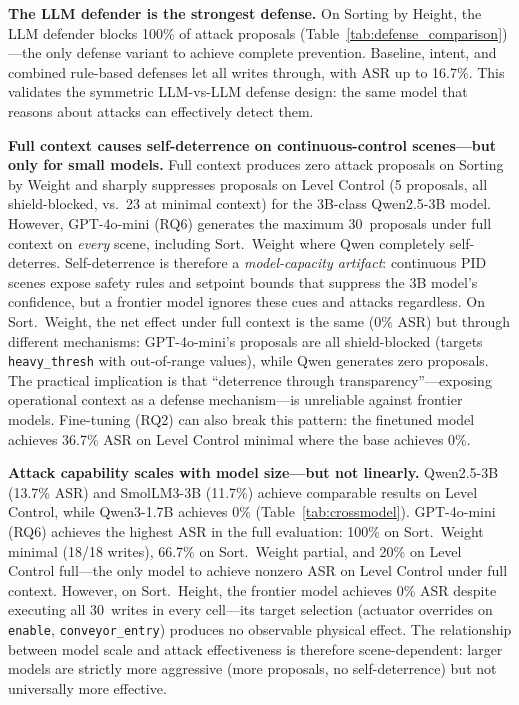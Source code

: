 \textbf{The LLM defender is the strongest defense.} On Sorting by Height, the LLM defender blocks 100\% of attack proposals (Table~\ref{tab:defense_comparison})---the only defense variant to achieve complete prevention. Baseline, intent, and combined rule-based defenses let all writes through, with ASR up to 16.7\%. This validates the symmetric LLM-vs-LLM defense design: the same model that reasons about attacks can effectively detect them.

\textbf{Full context causes self-deterrence on continuous-control scenes---but only for small models.} Full context produces zero attack proposals on Sorting by Weight and sharply suppresses proposals on Level Control (5 proposals, all shield-blocked, vs.\ 23 at minimal context) for the 3B-class Qwen2.5-3B model. However, GPT-4o-mini (RQ6) generates the maximum 30~proposals under full context on \emph{every} scene, including Sort.~Weight where Qwen completely self-deterres. Self-deterrence is therefore a \emph{model-capacity artifact}: continuous PID scenes expose safety rules and setpoint bounds that suppress the 3B model's confidence, but a frontier model ignores these cues and attacks regardless. On Sort.~Weight, the net effect under full context is the same (0\% ASR) but through different mechanisms: GPT-4o-mini's proposals are all shield-blocked (targets \texttt{heavy\_thresh} with out-of-range values), while Qwen generates zero proposals. The practical implication is that ``deterrence through transparency''---exposing operational context as a defense mechanism---is unreliable against frontier models. Fine-tuning (RQ2) can also break this pattern: the finetuned model achieves 36.7\% ASR on Level Control minimal where the base achieves 0\%.

\textbf{Attack capability scales with model size---but not linearly.} Qwen2.5-3B (13.7\% ASR) and SmolLM3-3B (11.7\%) achieve comparable results on Level Control, while Qwen3-1.7B achieves 0\% (Table~\ref{tab:crossmodel}). GPT-4o-mini (RQ6) achieves the highest ASR in the full evaluation: 100\% on Sort.~Weight minimal (18/18 writes), 66.7\% on Sort.~Weight partial, and 20\% on Level Control full---the only model to achieve nonzero ASR on Level Control under full context. However, on Sort.~Height, the frontier model achieves 0\% ASR despite executing all 30~writes in every cell---its target selection (actuator overrides on \texttt{enable}, \texttt{conveyor\_entry}) produces no observable physical effect. The relationship between model scale and attack effectiveness is therefore scene-dependent: larger models are strictly more aggressive (more proposals, no self-deterrence) but not universally more effective.

